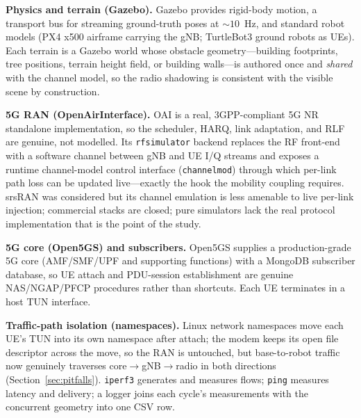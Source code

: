 \documentclass[10pt, conference]{IEEEtran}
\begin{document}
\textbf{Physics and terrain (Gazebo).} Gazebo provides rigid-body motion, a
transport bus for streaming ground-truth poses at ${\sim}10$~Hz, and standard
robot models (PX4 x500 airframe carrying the gNB; TurtleBot3 ground robots as
UEs). Each terrain is a Gazebo world whose obstacle geometry---building footprints,
tree positions, terrain height field, or building walls---is authored once and
\emph{shared} with the channel model, so the radio shadowing is consistent with the
visible scene by construction.

\textbf{5G RAN (OpenAirInterface).} OAI is a real, 3GPP-compliant 5G NR standalone
implementation, so the scheduler, HARQ, link adaptation, and RLF are genuine, not
modelled. Its \texttt{rfsimulator} backend replaces the RF front-end with a
software channel between gNB and UE I/Q streams and exposes a runtime
channel-model control interface (\texttt{channelmod}) through which per-link path
loss can be updated live---exactly the hook the mobility coupling requires.
srsRAN was considered but its channel emulation is less amenable to live per-link
injection; commercial stacks are closed; pure simulators lack the real protocol
implementation that is the point of the study.

\textbf{5G core (Open5GS) and subscribers.} Open5GS supplies a production-grade 5G
core (AMF/SMF/UPF and supporting functions) with a MongoDB subscriber database, so
UE attach and PDU-session establishment are genuine NAS/NGAP/PFCP procedures
rather than shortcuts. Each UE terminates in a host TUN interface.

\textbf{Traffic-path isolation (namespaces).} Linux network namespaces move each
UE's TUN into its own namespace after attach; the modem keeps its open file
descriptor across the move, so the RAN is untouched, but base-to-robot traffic now
genuinely traverses core$\rightarrow$gNB$\rightarrow$radio in both directions
(Section~\ref{sec:pitfalls}). \texttt{iperf3} generates and measures flows;
\texttt{ping} measures latency and delivery; a logger joins each cycle's
measurements with the concurrent geometry into one CSV row.
\end{document}
